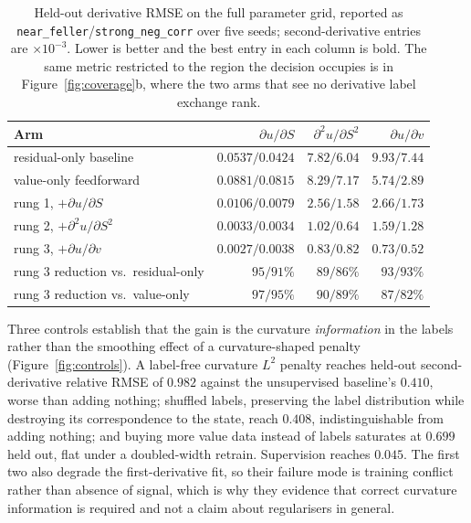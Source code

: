 \documentclass{article}
\begin{document}
\begin{table}[!htbp]
\caption{Held-out derivative RMSE on the full parameter grid, reported as
\texttt{near\_feller}/\texttt{strong\_neg\_corr} over five seeds; second-derivative
entries are $\times 10^{-3}$. Lower is better and the best entry in each column is
bold. The same metric restricted to the region the decision occupies is in
Figure~\ref{fig:coverage}b, where the two arms that see no derivative label
exchange rank.}
\label{tab:greeks}
\centering\footnotesize\setlength{\tabcolsep}{6pt}
\begin{tabular}{@{}lrrr@{}}
\toprule
Arm & $\partial u/\partial S$ & $\partial^{2}u/\partial S^{2}$ & $\partial u/\partial v$ \\
\midrule
residual-only baseline & $0.0537/0.0424$ & $7.82/6.04$ & $9.93/7.44$ \\
value-only feedforward & $0.0881/0.0815$ & $8.29/7.17$ & $5.74/2.89$ \\
rung 1, $+\partial u/\partial S$ & $0.0106/0.0079$ & $2.56/1.58$ & $2.66/1.73$ \\
rung 2, $+\partial^{2}u/\partial S^{2}$ & $0.0033/\mathbf{0.0034}$ & $1.02/\mathbf{0.64}$ & $1.59/1.28$ \\
rung 3, $+\partial u/\partial v$ & $\mathbf{0.0027}/0.0038$ & $\mathbf{0.83}/0.82$ & $\mathbf{0.73}/\mathbf{0.52}$ \\
\midrule
rung 3 reduction vs.\ residual-only & $95/91\%$ & $89/86\%$ & $93/93\%$ \\
rung 3 reduction vs.\ value-only & $97/95\%$ & $90/89\%$ & $87/82\%$ \\
\bottomrule
\end{tabular}
\end{table}


Three controls establish that the gain is the curvature \emph{information} in the
labels rather than the smoothing effect of a curvature-shaped penalty
(Figure~\ref{fig:controls}). A label-free curvature $L^{2}$ penalty reaches held-out
second-derivative relative RMSE of $0.982$ against the unsupervised baseline's
$0.410$, worse than adding nothing; shuffled labels, preserving the label
distribution while destroying its correspondence to the state, reach $0.408$,
indistinguishable from adding nothing; and buying more value data instead of labels
saturates at $0.699$ held out, flat under a doubled-width retrain. Supervision
reaches $0.045$. The first two also degrade the first-derivative fit, so their
failure mode is training conflict rather than absence of signal, which is why they
evidence that correct curvature information is required and not a claim about
regularisers in general.
\end{document}
